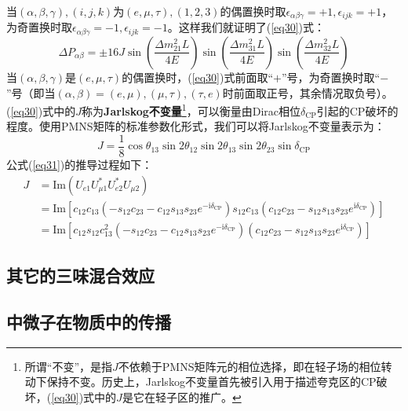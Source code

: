 \documentclass{article}
\newcommand{\ii}{\mathrm{i}}
\begin{document}
	当$(\alpha,\beta,\gamma),(i,j,k)$为$(e,\mu,\tau),(1,2,3)$的偶置换时取$\epsilon_{\alpha\beta\gamma}=+1,\epsilon_{ijk}=+1$，为奇置换时取$\epsilon_{\alpha\beta\gamma}=-1,\epsilon_{ijk}=-1$。这样我们就证明了(\ref{eq30})式：
	\begin{equation*}
		\Delta P_{\alpha\beta}=\pm 16J\sin\left(\frac{\Delta m_{21}^2L}{4E}\right)\sin\left(\frac{\Delta m_{31}^2L}{4E}\right)\sin\left(\frac{\Delta m_{32}^2L}{4E}\right)
	\end{equation*}
	当$(\alpha,\beta,\gamma)$是$(e,\mu,\tau)$的偶置换时，(\ref{eq30})式前面取“$+$”号，为奇置换时取“$-$”号（即当$(\alpha,\beta)=(e,\mu),(\mu,\tau),(\tau,e)$时前面取正号，其余情况取负号）。(\ref{eq30})式中的$J$称为\textbf{Jarlskog不变量}\footnote{所谓“不变”，是指$J$不依赖于PMNS矩阵元的相位选择，即在轻子场的相位转动下保持不变。历史上，Jarlskog不变量首先被引入用于描述夸克区的CP破坏\cite{jarlskog1985basis}，(\ref{eq30})式中的$J$是它在轻子区的推广。}，可以衡量由Dirac相位$\delta_\mathrm{CP}$引起的CP破坏的程度。使用PMNS矩阵的标准参数化形式，我们可以将Jarlskog不变量表示为：
	\begin{equation}
		J=\frac{1}{8} \cos\theta_{13}\sin2\theta_{12}\sin2\theta_{13}\sin2\theta_{23}\sin\delta_{\mathrm{CP}}
		\label{eq31}
	\end{equation}
	公式(\ref{eq31})的推导过程如下：
	\begin{equation*}
		\begin{aligned}
			J&=\mathrm{Im}(U_{e1}U_{\mu1}^*U_{e2}^*U_{\mu2})\\
			&=\mathrm{Im}\left[c_{12}c_{13}(-s_{12}c_{23}-c_{12}s_{13}s_{23}e^{-\ii\delta_{\mathrm{CP}}})s_{12}c_{13}(c_{12}c_{23}-s_{12}s_{13}s_{23}e^{\ii\delta_{\mathrm{CP}}})\right]\\
			&=\mathrm{Im}\left[c_{12}s_{12}c_{13}^2(-s_{12}c_{23}-c_{12}s_{13}s_{23}e^{-\ii\delta_{\mathrm{CP}}})(c_{12}c_{23}-s_{12}s_{13}s_{23}e^{\ii\delta_{\mathrm{CP}}})\right]
		\end{aligned}
	\end{equation*}
	
	
	
	
	
	
	
	
	
	
	
	
	
	
	
	
	
	\subsection{其它的三味混合效应}
	\subsection{中微子在物质中的传播\label{2.5}}
	\newpage
	\printbibliography
\end{document}
